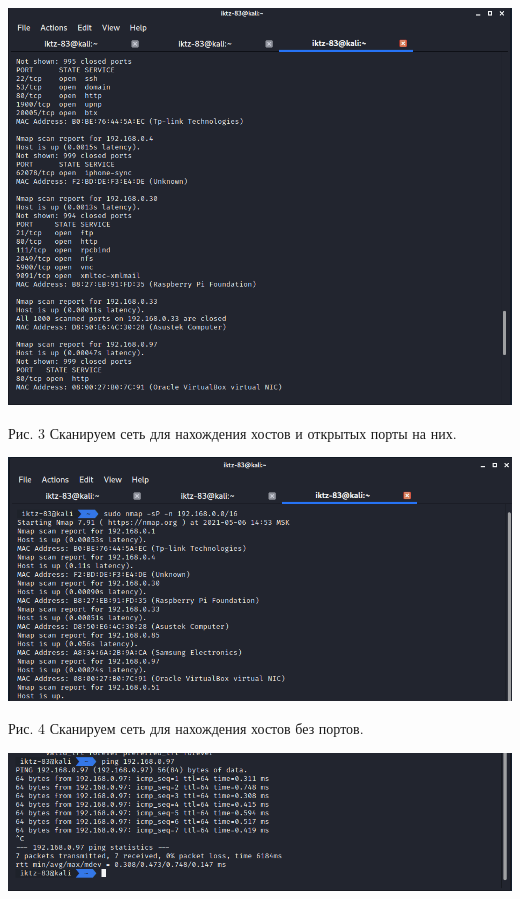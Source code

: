\documentclass[a4paper,14pt]{extarticle}
\begin{document}
\begin{center}
        \includegraphics[scale=0.5]{pics/2.png}

        Рис. 3 Сканируем сеть для нахождения хостов и открытых порты на них.
        \vspace{1ex}

        \includegraphics[scale=0.5]{pics/3.png}

        Рис. 4 Сканируем сеть для нахождения хостов без портов.
        \vspace{1ex}

        \includegraphics[scale=0.48]{pics/4.png}


\end{center}
\end{document}
